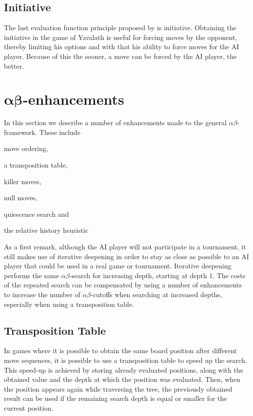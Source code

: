 \documentclass[11pt]{article}
\begin{document}
\subsection{Initiative}
\label{-subsec:initiative}
The last evaluation function principle proposed by \cite{Winands2004} is initiative. Obtaining the initiative in the game of Yavalath is useful for forcing moves by the opponent, thereby limiting his options and with that his ability to force moves for the AI player. Because of this the sooner, a move can be forced by the AI player, the better.

\section{\texorpdfstring{$\boldsymbol{\alpha\beta}$}{alphabeta}-enhancements}
\label{-sec:alphabeta-enhancements}%
In this section we describe a number of enhancements made to the general $\alpha\beta$-framework. These include \begin{enumerate*}\item move ordering, \item a transposition table, \item killer moves, \item null moves, \item quiescence search and \item the relative history heuristic\end{enumerate*}
As a first remark, although the AI player will not participate in a tournament, it still makes use of iterative deepening in order to stay as close as possible to an AI player that could be used in a real game or tournament. Iterative deepening performs the same $\alpha\beta$-search for increasing depth, starting at depth $1$. The costs of the repeated search can be compensated by using a number of enhancements to increase the number of $\alpha\beta$-cutoffs when searching at increased depths, especially when using a transposition table.

\subsection{Transposition Table}
\label{-subsec:transpositiontable}
In games where it is possible to obtain the same board position after different move sequences, it is possible to use a transposition table to speed up the search. This speed-up is achieved by storing already evaluated positions, along with the obtained value and the depth at which the position was evaluated. Then, when the position appears again while traversing the tree, the previously obtained result can be used if the remaining search depth is equal or smaller for the current position.
\end{document}
